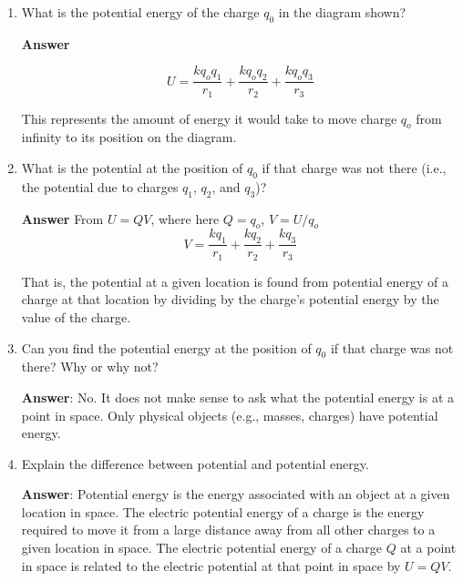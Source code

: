 \documentclass{article}
\begin{document}
\begin{enumerate}

  \item What is the potential energy of the charge $q_0$ in the diagram shown?

        \ifsolutions
          \textbf{Answer}
        
          \begin{equation}
        U = \frac{kq_oq_1}{r_1}+\frac{kq_oq_2}{r_2}+\frac{kq_oq_3}{r_3}
        \end{equation}
        
          This represents the amount of energy it would take to move charge $q_o$ from infinity to its position on the 
        diagram.
        \fi

  \item What is the potential at the position of $q_0$ if that charge was not there (i.e., the potential due to charges $q_1$, $q_2$, and $q_3$)?

        \ifsolutions
          \textbf{Answer} From $U=QV$, where here $Q=q_o$, $V=U/q_o$ 
        \begin{equation}
        V = \frac{kq_1}{r_1}+\frac{kq_2}{r_2}+\frac{kq_3}{r_3}
        \end{equation}
        
          That is, the potential at a given location is found from potential energy of a charge at that location by dividing by the charge's potential energy by the value of the charge.
        \fi

  \item Can you find the potential energy at the position of $q_0$ if that charge was not there? Why or why not?

        \ifsolutions
          \textbf{Answer}: No. It does not make sense to ask what the potential energy is at a point in space. Only physical objects (e.g., masses, charges) have potential energy.
        \fi

  \item Explain the difference between potential and potential energy.

        \ifsolutions
          \textbf{Answer}: Potential energy is the energy associated with an object at a given location in space. The electric potential energy of a charge is the energy required to move it from a large distance away from all other charges to a given location in space. The electric potential energy of a charge $Q$ at a point in space is related to the electric potential at that point in space by $U=QV$.
        \fi

\end{enumerate}
\end{document}
